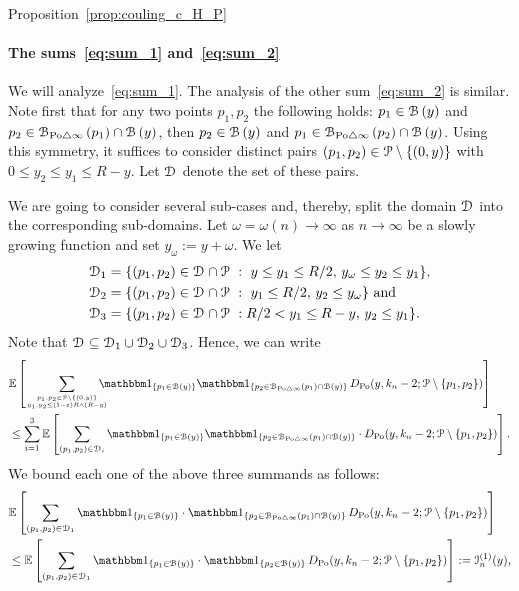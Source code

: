 \begin{proofof}{Proposition~\ref{prop:couling_c_H_P}}
\paragraph{The sums~\eqref{eq:sum_1} and~\eqref{eq:sum_2}}

We will analyze~\eqref{eq:sum_1}. The analysis of the other sum~\eqref{eq:sum_2} is similar.
Note first that for any two points $p_1,p_2$ the following holds: $p_1 \in {\mathcal B}\left(y\right)$ and $p_2 \in {\mathcal B}_{{\mathrm{Po}} \bigtriangleup \infty}\left(p_1\right)\cap {\mathcal B}\left(y\right)$, then $p_2 \in {\mathcal B}\left(y\right)$ and $p_1 \in {\mathcal B}_{{\mathrm{Po}} \bigtriangleup \infty}\left(p_2\right)\cap {\mathcal B}\left(y\right)$.
Using this symmetry, it suffices to consider distinct pairs $(p_1,p_2) \in {\mathcal P} \setminus \{(0,y)\}$ with $0\leq y_2 \leq y_1 \leq R- y$. Let $\mathcal{D}_{}$ denote the set of these pairs. 

We are going to consider several sub-cases and, thereby, split the domain $\mathcal{D}_{}$ into the corresponding sub-domains. 
Let $\omega =\omega (n) \to \infty$ as $n\to \infty$ be a slowly growing function and set $y_\omega := y +\omega$. 
We let 
\begin{align*}
	\mathcal{D}_{1} &= \{(p_1,p_2) \in \mathcal{D}_{} \cap {\mathcal P} \ : \ y \leq y_1 \leq R/2, \, y_\omega \leq y_2 \leq y_1 \},\\
	\mathcal{D}_{2} &= \{(p_1,p_2) \in \mathcal{D}_{} \cap {\mathcal P} \ : \ y_1 \leq R/2, \, y_2 \leq y_\omega \} \text{ and }\\
	\mathcal{D}_{3} &=  \{(p_1,p_2) \in \mathcal{D}_{} \cap {\mathcal P} \ : R/2 < y_1 \leq R -y, \, y_2 \leq y_1 \}.
\end{align*} 
Note that $\mathcal{D}_{} \subseteq \mathcal{D}_{1} \cup \mathcal{D}_{2}\cup \mathcal{D}_{3}$.
Hence, we can write 
\begin{equation} \label{eq:1sum-rewriting}
\begin{split} 
	&\Exp{\sum_{p_1, p_2\in \Pcal \setminus \{(0,y)\} 
	\atop y_1, y_2 \leq (1-\eps) R\wedge (R-y)} \hspace{-10pt} \ind{p_1 \in \BallHyp{y}} 
	\ind{p_2 \in \BallSym{p_1}\cap \BallHyp{y}} 
	\, D_{\Po} (y,k_n-2;\Pcal \setminus \{p_1,p_2\})} \\ 
	&\le \sum_{i=1}^3 \Exp{\sum_{(p_1, p_2)\in \dom{i}} \ind{p_1 \in \BallHyp{y}} 
	\ind{p_2 \in \BallSym{p_1}\cap \BallHyp{y}} \cdot D_{\Po} (y,k_n-2;\Pcal \setminus \{p_1,p_2\})}.
\end{split}
\end{equation}
We bound each one of the above three summands as follows:  
\begin{equation} \label{eq:term1}
\begin{split}
	&\Exp{\sum_{(p_1, p_2)\in \dom{1}} \ind{p_1 \in \BallHyp{y}} \cdot \ind{p_2 \in \BallSym{p_1}\cap \BallHyp{y}} 
		\, D_{\Po} (y,k_n-2;\Pcal \setminus \{p_1,p_2\})} \\
	&\le \Exp{\sum_{(p_1, p_2)\in \dom{1}} \ind{p_1 \in \BallHyp{y}} \cdot \ind{p_2 \in  \BallHyp{y}} 
		\, D_{\Po} (y,k_n-2;\Pcal \setminus \{p_1,p_2\})} := \mathcal{I}_n^{(1)}(y),
\end{split}
\end{equation}


\end{proofof}
